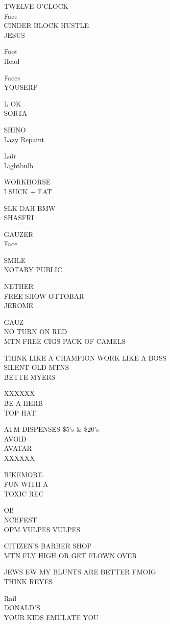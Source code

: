 \documentclass[10pt,letterpaper]{article}
\begin{document}
TWELVE O'CLOCK\\
Face\\
CINDER BLOCK HUSTLE\\
JESUS

Foot\\
Head

Faces\\
YOUSERP

L OK\\
SORTA

SHINO\\
Lazy Repaint

Lair\\
Lightbulb

WORKHORSE\\
I SUCK + EAT

SLK DAH BMW\\
SHASFRI

GAUZER\\
Face

SMILE\\
NOTARY PUBLIC

NETHER\\
FREE SHOW OTTOBAR\\
JEROME

GAUZ\\
NO TURN ON RED\\
MTN FREE CIGS PACK OF CAMELS

THINK LIKE A CHAMPION WORK LIKE A BOSS\\
SILENT OLD MTNS\\
BETTE MYERS

XXXXXX\\
BE A HERB\\
TOP HAT

ATM DISPENSES \$5's \& \$20's\\
AVOID\\
AVATAR\\
XXXXXX

BIKEMORE\\
FUN WITH A\\
TOXIC REC

OI!\\
NCHFEST\\
OPM VULPES VULPES

CITIZEN'S BARBER SHOP\\
MTN FLY HIGH OR GET FLOWN OVER

JEWS EW MY BLUNTS ARE BETTER FMOIG\\
THINK REYES

Rail\\
DONALD'S\\
YOUR KIDS EMULATE YOU
\end{document}
